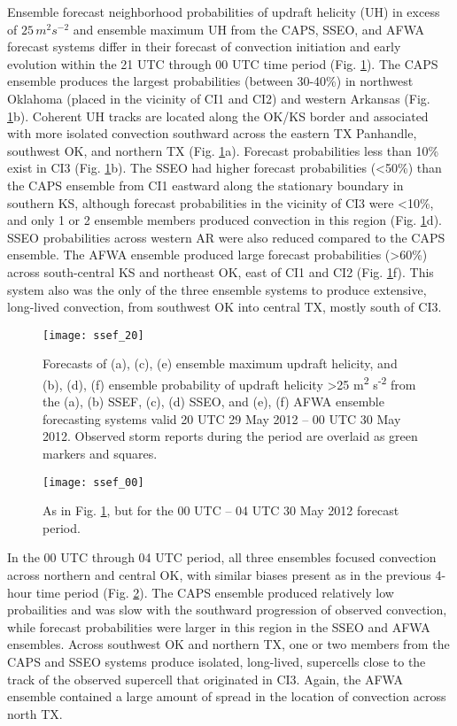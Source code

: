Ensemble forecast neighborhood probabilities of updraft helicity (UH) in excess of \(25\,m^2 s^{-2} \) and ensemble maximum UH from the CAPS, SSEO, and AFWA forecast systems differ in their forecast of convection initiation and early evolution within the 21 UTC through 00 UTC time period (Fig. \ref{ssef_20}). The CAPS ensemble produces the largest probabilities (between 30-40\%) in northwest Oklahoma (placed in the vicinity of CI1 and CI2) and western Arkansas (Fig. \ref{ssef_20}b). Coherent UH tracks are located along the OK/KS border and associated with more isolated convection southward across the eastern TX Panhandle, southwest OK, and northern TX (Fig. \ref{ssef_20}a). Forecast probabilities less than 10\% exist in CI3 (Fig. \ref{ssef_20}b). The SSEO had higher forecast probabilities (\textless 50\%) than the CAPS ensemble from CI1 eastward along the stationary boundary in southern KS, although forecast probabilities in the vicinity of CI3 were \textless 10\%, and only 1 or 2 ensemble members produced convection in this region (Fig. \ref{ssef_20}d). SSEO probabilities across western AR were also reduced compared to the CAPS ensemble. The AFWA ensemble produced large forecast probabilities (\textgreater 60\%) across south-central KS and northeast OK, east of CI1 and CI2 (Fig. \ref{ssef_20}f). This system also was the only of the three ensemble systems to produce extensive, long-lived convection, from southwest OK into central TX, mostly south of CI3.
\begin{figure}
\centering
\texttt{[image: ssef\_20]}
\caption{Forecasts of (a), (c), (e) ensemble maximum updraft helicity, and (b), (d), (f) ensemble probability of updraft helicity \textgreater 25 m\textsuperscript{2} s\textsuperscript{-2} from the (a), (b) SSEF, (c), (d) SSEO, and (e), (f) AFWA ensemble forecasting systems valid 20 UTC 29 May 2012 -- 00 UTC 30 May 2012. Observed storm reports during the period are overlaid as green markers and squares.}
\label{ssef_20}
\end{figure}
\begin{figure}
\centering
\texttt{[image: ssef\_00]}
\caption{As in Fig. \ref{ssef_20}, but for the 00 UTC -- 04 UTC 30 May 2012 forecast period.}
\label{ssef_00}
\end{figure}

In the 00 UTC through 04 UTC period, all three ensembles focused convection across northern and central OK, with similar biases present as in the previous 4-hour time period (Fig. \ref{ssef_00}). The CAPS ensemble produced relatively low probailities and was slow with the southward progression of observed convection, while forecast probabilities were larger in this region in the SSEO and AFWA ensembles. Across southwest OK and northern TX, one or two members from the CAPS and SSEO systems produce isolated, long-lived, supercells close to the track of the observed supercell that originated in CI3. Again, the AFWA ensemble contained a large amount of spread in the location of convection across north TX.


